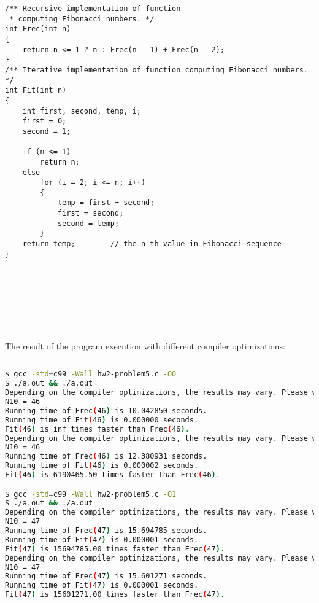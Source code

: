 \documentclass{article}
\begin{document}
\begin{verbatim}
/** Recursive implementation of function
 * computing Fibonacci numbers. */
int Frec(int n)
{
    return n <= 1 ? n : Frec(n - 1) + Frec(n - 2);
}
/** Iterative implementation of function computing Fibonacci numbers. */
int Fit(int n)
{
    int first, second, temp, i;
    first = 0;
    second = 1;

    if (n <= 1)
        return n;
    else
        for (i = 2; i <= n; i++)
        {
            temp = first + second;
            first = second;
            second = temp;
        }
    return temp;        // the n-th value in Fibonacci sequence
}
		\end{verbatim}
		
		
\paragraph{}\
\paragraph{}\
\paragraph{}\

	\rmfamily
	\noindent The result of the program execution with different compiler optimizations:
	
	\ttfamily
	\begin{lstlisting}[language=bash]
	
$ gcc -std=c99 -Wall hw2-problem5.c -O0
$ ./a.out && ./a.out
Depending on the compiler optimizations, the results may vary. Please wait...
N10 = 46
Running time of Frec(46) is 10.042850 seconds.
Running time of Fit(46) is 0.000000 seconds.
Fit(46) is inf times faster than Frec(46).
Depending on the compiler optimizations, the results may vary. Please wait...
N10 = 46
Running time of Frec(46) is 12.380931 seconds.
Running time of Fit(46) is 0.000002 seconds.
Fit(46) is 6190465.50 times faster than Frec(46).

$ gcc -std=c99 -Wall hw2-problem5.c -O1
$ ./a.out && ./a.out
Depending on the compiler optimizations, the results may vary. Please wait...
N10 = 47
Running time of Frec(47) is 15.694785 seconds.
Running time of Fit(47) is 0.000001 seconds.
Fit(47) is 15694785.00 times faster than Frec(47).
Depending on the compiler optimizations, the results may vary. Please wait...
N10 = 47
Running time of Frec(47) is 15.601271 seconds.
Running time of Fit(47) is 0.000001 seconds.
Fit(47) is 15601271.00 times faster than Frec(47).
	\end{lstlisting}
	
\end{document}
